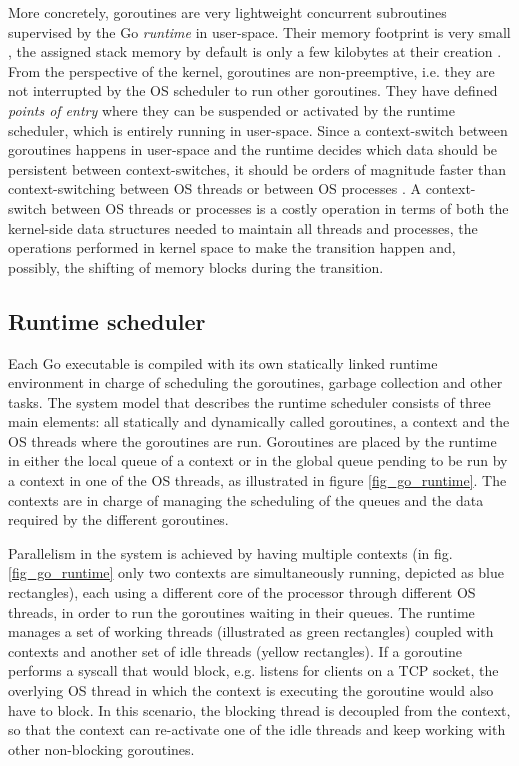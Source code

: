 More concretely, goroutines are very lightweight concurrent subroutines  supervised by the Go \textit{runtime} in user-space. Their memory footprint is very small \cite{2013ContextSwitching}, the assigned stack memory by default is only a few kilobytes at their creation \cite{Cox-Buday2017}. From the perspective of the kernel, goroutines are non-preemptive, i.e. they are not interrupted by the OS scheduler to run other goroutines. They have defined \textit{points of entry} where they can be suspended or activated by the runtime scheduler, which is entirely running in user-space. Since a context-switch between goroutines happens in user-space and the runtime decides which data should be persistent between context-switches, it should be orders of magnitude faster than context-switching between OS threads \cite{Cox-Buday2017} or between OS processes \cite{Kerrisk2010}. A context-switch between OS threads or processes is a costly operation in terms of both the kernel-side data structures needed to maintain all threads and processes, the operations performed in kernel space to make the transition happen and, possibly, the shifting of memory blocks during the transition.

\subsection{Runtime scheduler}
Each Go executable is compiled with its own statically linked runtime environment in charge of scheduling the goroutines, garbage collection and other tasks. The system model that describes the runtime scheduler consists of three main elements: all statically and dynamically called goroutines, a context and the OS threads where the goroutines are run. Goroutines are placed by the runtime in either the local queue of a context or in the global queue pending to be run by a context in one of the OS threads, as illustrated in figure \ref{fig_go_runtime}. The contexts are in charge of managing the scheduling of the queues and the data required by the different goroutines.

Parallelism in the system is achieved by having multiple contexts (in fig. \ref{fig_go_runtime} only two contexts are simultaneously running, depicted as blue rectangles), each using a different core of the processor through different OS threads, in order to run the  goroutines waiting in their queues. The runtime manages a set of working threads (illustrated as green rectangles) coupled with contexts and another set of idle threads (yellow rectangles).  If a goroutine performs a syscall that would block, e.g. listens for clients on a TCP socket, the overlying OS thread in which the context is executing the goroutine would also have to block. In this scenario, the blocking thread is decoupled from the context, so that the context can re-activate one of the idle threads and keep working with other non-blocking goroutines.

